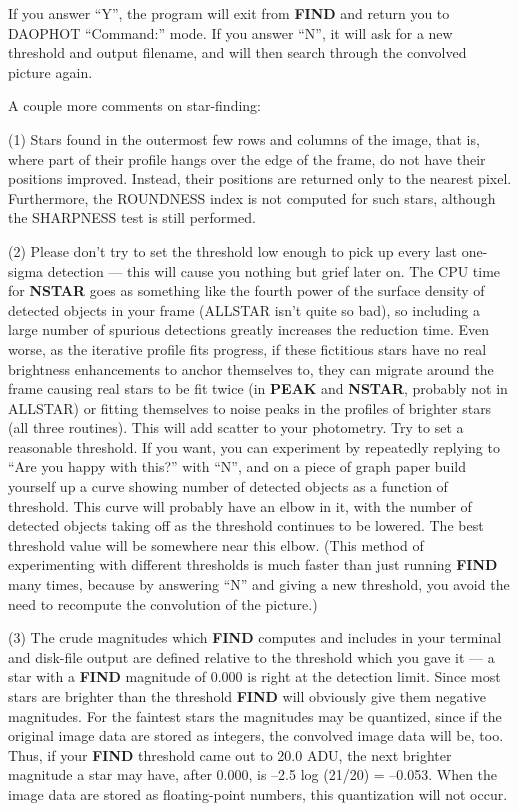 \noindent If you answer ``Y'', the program will exit from {\bf FIND}
and return you to DAOPHOT ``Command:'' mode.  If you answer ``N'', it
will ask for a new threshold and output filename, and will then search
through the convolved picture again. 

A couple more comments on star-finding: 

\item{(1)} Stars found in the outermost few rows and columns of the
image, that is, where part of their profile hangs over the edge of the
frame, do not have their positions improved.  Instead, their positions
are returned only to the nearest pixel.  Furthermore, the ROUNDNESS
index is not computed for such stars, although the SHARPNESS test is
still performed.

\item{(2)} Please don't try to set the threshold low enough to pick up
every last one-sigma detection --- this will cause you nothing but
grief later on.  The CPU time for {\bf NSTAR} goes as something like
the fourth power of the surface density of detected objects in your
frame (ALLSTAR isn't quite so bad), so including a large number
of spurious detections greatly increases the reduction time.  Even
worse, as the iterative profile fits progress, if these fictitious
stars have no real brightness enhancements to anchor themselves to,
they can migrate around the frame causing real stars to be fit twice
(in {\bf PEAK} and {\bf NSTAR}, probably not in ALLSTAR) or
fitting themselves to noise peaks in the profiles of brighter stars
(all three routines).  This will add scatter to your photometry.  Try
to set a reasonable threshold. If you want, you can experiment by
repeatedly replying to ``Are you happy with this?'' with ``N'', and on
a piece of graph paper build yourself up a curve showing number of
detected objects as a function of threshold.  This curve will probably
have an elbow in it, with the number of detected objects taking off as
the threshold continues to be lowered. The best threshold value will be
somewhere near this elbow.  (This method of experimenting with
different thresholds is much faster than just running {\bf FIND} many
times, because by answering ``N'' and giving a new threshold, you avoid
the need to recompute the convolution of the picture.)

\item{(3)} The crude magnitudes which {\bf FIND} computes and includes
in your terminal and disk-file output are defined relative to the
threshold which you gave it --- a star with a {\bf FIND} magnitude of
0.000 is right at the detection limit. Since most stars are brighter
than the threshold {\bf FIND} will obviously give them negative
magnitudes.  For the faintest stars the magnitudes may be quantized,
since if the original image data are stored as integers, the convolved
image data will be, too.  Thus, if your {\bf FIND} threshold came out
to 20.0 ADU, the next brighter magnitude a star may have, after 0.000,
is --2.5 log (21/20) = --0.053.  When the image data are stored as
floating-point numbers, this quantization will not occur.


